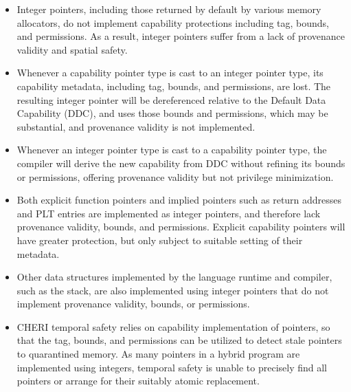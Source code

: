 \documentclass[12pt,twoside,openright,a4paper]{article}
\newcommand{\note}[2]{{\color{blue}[ Note: #1 - #2]}}
\renewcommand{\note}[2]{\relax\ifhmode\unskip\fi}
\newcommand{\bdnote}[1]{\note{#1}{Brooks D.}}
\newcommand{\nwfnote}[1]{\note{#1}{nwf}}
\newcommand{\dcnote}[1]{\note{#1}{David}}
\begin{document}
\begin{itemize}
\item Integer pointers, including those returned by default by various memory allocators, do
  not implement capability protections including tag, bounds, and permissions.
  As a result, integer pointers suffer from a lack of provenance validity and
  spatial safety.
  \bdnote{Furthermore, an unmodified allocator may produce allocations lacking
  sufficent alignment support precise bounds.}

\item Whenever a capability pointer type is cast to an integer pointer type,
  its capability metadata, including tag, bounds, and permissions, are lost.
  The resulting integer pointer will be dereferenced relative to the Default
  Data Capability (DDC), and uses those bounds and permissions, which may be
  substantial, and provenance validity is not implemented.

  \dcnote{And, more importantly, casts are not symmetric.  Int to cap pointer
    casts always allow you to access everything with the result that you could
    access with the source.  Caps to int casts may give null.  In to cap to int
    casts are always safe round trips, cap to int to cap may give either a
    capability with more rights or the null capability.}

  \nwfnote{Casts to integers of tag-clear capabilities trap or succeed?}

\item Whenever an integer pointer type is cast to a capability pointer type,
  the compiler will derive the new capability from DDC without refining its
  bounds or permissions, offering provenance validity but not privilege
  minimization.

\item Both explicit function pointers and implied pointers such as return
  addresses and PLT entries are implemented as integer pointers, and therefore
  lack provenance validity, bounds, and permissions.
  Explicit capability pointers will have greater protection, but only subject
  to suitable setting of their metadata.

\item Other data structures implemented by the language runtime and compiler,
  such as the stack, are also implemented using integer pointers that do not
  implement provenance validity, bounds, or permissions.

\item CHERI temporal safety relies on capability implementation of pointers,
  so that the tag, bounds, and permissions can be utilized to detect stale
  pointers to quarantined memory.
  As many pointers in a hybrid program are implemented using integers,
  temporal safety is unable to precisely find all pointers or arrange for
  their suitably atomic replacement.
  \dcnote{I think I'd phrase this slightly differently.  From the perspective
    of revocation, DDC (which encompases the C heap, stack, and image), is a
    single object and so no object reachable from the hybrid heap / stack /
    globals will ever be revoked.}
\end{itemize}
\end{document}
